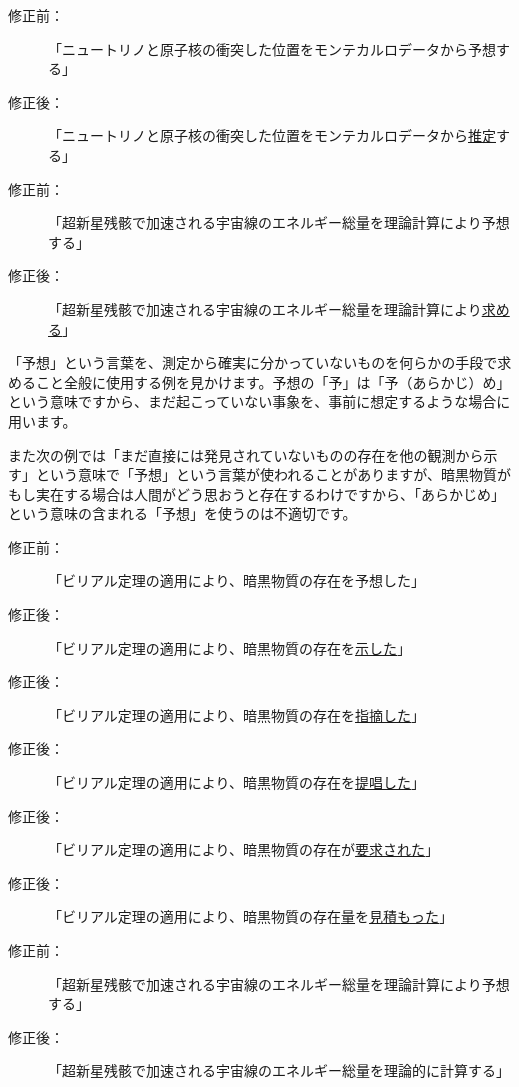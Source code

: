 \begin{description}
\item[修正前：]「ニュートリノと原子核の衝突した位置をモンテカルロデータから予想する」
\item[修正後：]「ニュートリノと原子核の衝突した位置をモンテカルロデータから\underline{推定}する」
\end{description}
\begin{description}
\item[修正前：]「超新星残骸で加速される宇宙線のエネルギー総量を理論計算により予想する」
\item[修正後：]「超新星残骸で加速される宇宙線のエネルギー総量を理論計算により\underline{求める}」
\end{description}

「予想」という言葉を、測定から確実に分かっていないものを何らかの手段で求めること全般に使用する例を見かけます。予想の「予」は「予（あらかじ）め」という意味ですから、まだ起こっていない事象を、事前に想定するような場合に用います。

また次の例では「まだ直接には発見されていないものの存在を他の観測から示す」という意味で「予想」という言葉が使われることがありますが、暗黒物質がもし実在する場合は人間がどう思おうと存在するわけですから、「あらかじめ」という意味の含まれる「予想」を使うのは不適切です。

\begin{description}
\item[修正前：]「ビリアル定理の適用により、暗黒物質の存在を予想した」
\item[修正後：]「ビリアル定理の適用により、暗黒物質の存在を\underline{示した}」
\item[修正後：]「ビリアル定理の適用により、暗黒物質の存在を\underline{指摘した}」
\item[修正後：]「ビリアル定理の適用により、暗黒物質の存在を\underline{提唱した}」
\item[修正後：]「ビリアル定理の適用により、暗黒物質の存在が\underline{要求された}」
\item[修正後：]「ビリアル定理の適用により、暗黒物質の存在\underline{量}を\underline{見積もった}」
\end{description}

\begin{description}
\item[修正前：]「超新星残骸で加速される宇宙線のエネルギー総量を理論計算により予想する」
\item[修正後：]「超新星残骸で加速される宇宙線のエネルギー総量を理論的に計算する」
\end{description}

